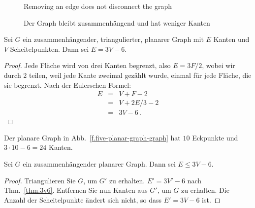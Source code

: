 \begin{figure}[ht]
\begin{minipage}{.45\textwidth}
\caption{Removing an edge does not disconnect the graph}\label{f.five-connected-remains}
\end{minipage}
\hfill
\begin{minipage}{.45\textwidth}
\caption{Der Graph bleibt zusammenhängend und hat weniger Kanten}\label{f.five-connected-fewer}
\end{minipage}
\end{figure}

\begin{theorem}\label{thm.3v6}
Sei $G$ ein zusammenhängender, triangulierter, planarer Graph mit $E$ Kanten und $V$ Scheitelpunkten. Dann sei $E= 3V-6$.
\end{theorem}
\begin{proof}
Jede Fläche wird von drei Kanten begrenzt, also $E=3F/2$, wobei wir durch $2$ teilen, weil jede Kante zweimal gezählt wurde, einmal für jede Fläche, die sie begrenzt. Nach der Eulerschen Formel:
\begin{eqnarray*}
E&=&V+F-2\\
&=&V+2E/3-2\\
&=&3V-6\,.
\end{eqnarray*}
\end{proof}

\begin{example}
Der planare Graph in Abb.~\ref{f.five-planar-graph-graph} hat $10$ Eckpunkte und $3\cdot 10-6=24$ Kanten.
\end{example}

\begin{theorem}\label{thm.count}
Sei $G$ ein zusammenhängender planarer Graph. Dann sei $E\leq 3V-6$.
\end{theorem}

\begin{proof}
Triangulieren Sie $G$, um $G'$ zu erhalten. $E'= 3V'-6$ nach Thm.~\ref{thm.3v6}. Entfernen Sie nun Kanten aus $G'$, um $G$ zu erhalten. Die Anzahl der Scheitelpunkte ändert sich nicht, so dass $E'= 3V-6$ ist.
\end{proof}

